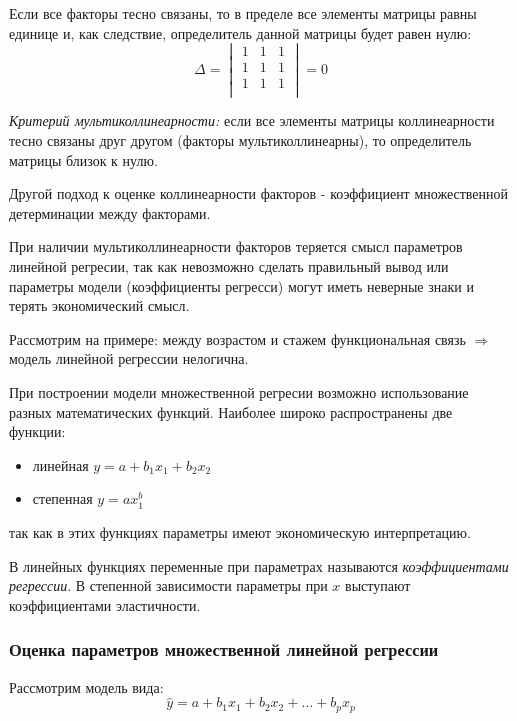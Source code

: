\documentclass[aps,%
12pt,%
final,%
oneside,
onecolumn,%
musixtex, %
superscriptaddress,%
centertags]{article} %
\begin{document}
Если все факторы тесно связаны, то в пределе все элементы матрицы равны единице и, как следствие, определитель данной матрицы будет равен нулю:
$$ \Delta =
\begin{vmatrix}
	1 & 1 & 1 \\
	1 & 1 & 1 \\
	1 & 1 & 1 \\
\end{vmatrix} = 0
$$

\textit{Критерий мультиколлинеарности:} если все элементы матрицы коллинеарности тесно связаны друг другом (факторы мультиколлинеарны), то определитель матрицы близок к нулю. 

Другой подход к оценке коллинеарности факторов - коэффициент множественной детерминации между факторами.

При наличии мультиколлинеарности факторов теряется смысл параметров линейной регресии, так как невозможно сделать правильный вывод или параметры модели (коэффициенты регресси) могут иметь неверные знаки и терять экономический смысл.

Рассмотрим на примере: между возрастом и стажем функциональная связь $\Rightarrow$ модель линейной регрессии нелогична.

При построении модели множественной регресии возможно использование разных математических функций.
Наиболее широко распространены две функции:

\begin{itemize}
	\item линейная $y = a + b_1x_1 + b_2x_2 $
	\item степенная $y = ax_1^b $
\end{itemize}

так как в этих функциях параметры имеют экономическую интерпретацию.

В линейных функциях переменные при параметрах называются \textit{коэффициентами регрессии}. В степенной зависимости параметры при $x$ выступают коэффициентами эластичности.

\subsubsection{Оценка параметров множественной линейной регрессии}

Рассмотрим модель вида:
$$ \widehat{y} = a +b_1x_1 + b_2x_2 + \ldots + b_px_p$$
\end{document}
